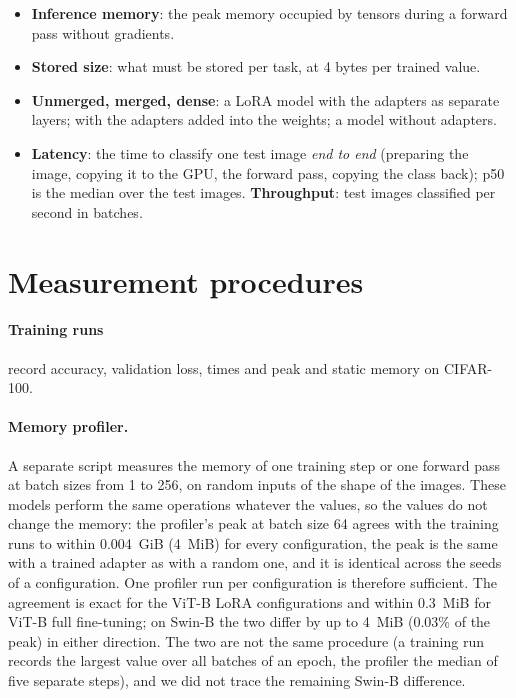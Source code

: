 \begin{itemize}
        \textbf{activation memory} the part kept for the backward pass (Section~\ref{sec:bg_memory}).
  \item \textbf{Inference memory}: the peak memory occupied by tensors during a forward pass without gradients.
  \item \textbf{Stored size}: what must be stored per task, at 4 bytes per trained value.
  \item \textbf{Unmerged, merged, dense}: a LoRA model with the adapters as separate layers; with the adapters
        added into the weights; a model without adapters.
  \item \textbf{Latency}: the time to classify one test image \emph{end to end} (preparing the image, copying it
        to the GPU, the forward pass, copying the class back); p50 is the median over the test images.
        \textbf{Throughput}: test images classified per second in batches.
\end{itemize}

\section{Measurement procedures}
\label{sec:procedures}

\paragraph{Training runs} record accuracy, validation loss, times and peak and static memory on CIFAR-100.

\paragraph{Memory profiler.} A separate script measures the memory of one training step or one forward pass at
batch sizes from 1 to 256, on random inputs of the shape of the images. These models perform the same operations
whatever the values, so the values do not change the memory: the profiler's peak at batch size 64 agrees with the
training runs to within 0.004~GiB (4~MiB) for every configuration, the peak is the same with a trained adapter as with a
random one, and it is identical across the seeds of a configuration. One profiler run per configuration is
therefore sufficient. The agreement is exact for the ViT-B LoRA configurations and within 0.3~MiB for ViT-B full
fine-tuning; on Swin-B the two differ by up to 4~MiB (0.03\% of the peak) in either direction. The two are not the
same procedure (a training run records the largest value over all batches of an epoch, the profiler the median of
five separate steps), and we did not trace the remaining Swin-B difference.

